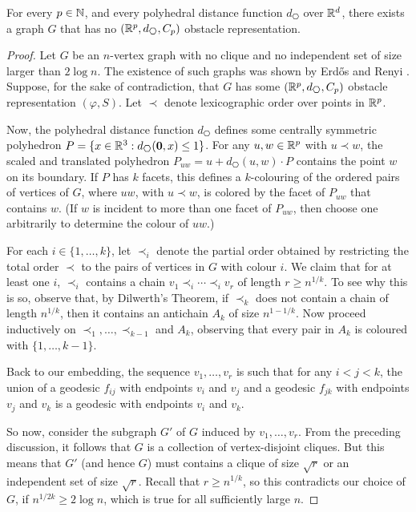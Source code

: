 \documentclass{patmorin}
\begin{document}
\begin{thm}
  For every $p\in\mathbb{N}$, and every polyhedral distance function
  $d_{\hexagon}$ over $\mathbb{R}^d$, there exists a graph $G$ that has no $(\R^p,
  d_{\hexagon}, C_p)$ obstacle representation.
\end{thm}


\begin{proof}
  Let $G$ be an $n$-vertex graph with no clique and no independent set of
  size larger than $2\log n$. The existence of such graphs was shown by
  Erd\H{o}s and Renyi \cite{X}. Suppose, for the sake of contradiction,
  that $G$ has some $(\R^p, d_{\hexagon}, C_p)$ obstacle representation
  $(\varphi,S)$. Let $\prec$ denote lexicographic order over points
  in $\mathbb{R}^{p}$.

  Now, the polyhedral distance function $d_{\hexagon}$
  defines some centrally symmetric polyhedron
  $P=\{x\in\R^3:d_{\hexagon}(\mathbf{0},x)\le 1\}$.  For any $u,w\in
  \mathbb{R}^p$ with $u\prec w$, the scaled and translated polyhedron
  $P_{uw}=u+d_{\hexagon}(u,w)\cdot P$ contains the point $w$ on its
  boundary.  If $P$ has $k$ facets, this defines a $k$-colouring of
  the ordered pairs of vertices of $G$, where $uw$, with $u\prec w$,
  is colored by the facet of $P_{uw}$ that contains $w$.  (If $w$
  is incident to more than one facet of $P_{uw}$, then choose one
  arbitrarily to determine the colour of $uw$.)

  For each $i\in\{1,\ldots,k\}$, let $\prec_i$ denote the partial
  order obtained by restricting the total order $\prec$ to the pairs of
  vertices in $G$ with colour $i$.  We claim that for at least one $i$,
  $\prec_i$ contains a chain $v_1\prec_i\cdots\prec_i v_r$ of length
  $r\ge n^{1/k}$.  To see why this is so, observe that, by Dilwerth's
  Theorem, if $\prec_k$ does not contain a chain of length $n^{1/k}$,
  then it contains an antichain $A_k$ of size $n^{1-1/k}$.  Now proceed
  inductively on $\prec_1,\ldots,\prec_{k-1}$ and $A_k$, observing that
  every pair in $A_k$ is coloured with $\{1,\ldots,k-1\}$.

  Back to our embedding, the sequence $v_1,\ldots,v_r$ is such that for
  any $i<j<k$, the union of a geodesic $f_{ij}$ with endpoints $v_i$
  and $v_j$ and a geodesic $f_{jk}$ with endpoints $v_j$ and $v_k$
  is a geodesic with endpoints $v_i$ and $v_k$.
  
  So now, consider the subgraph $G'$ of $G$ induced by
  $v_1,\ldots,v_r$. From the preceding discussion, it follows that $G$
  is a collection of vertex-disjoint cliques.  But this means that
  $G'$ (and hence $G$) must contains a clique of size $\sqrt{r}$ or
  an independent set of size $\sqrt{r}$.  Recall that $r\ge
  n^{1/k}$, so this contradicts our choice of $G$, if $n^{1/2k} \ge
  2\log n$, which is true for all sufficiently large $n$.
\end{proof}
\end{document}
